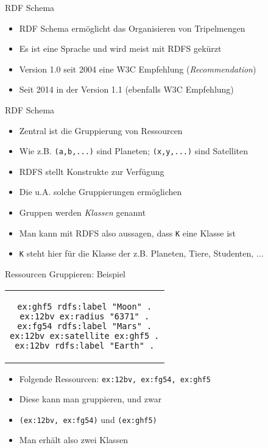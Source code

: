 \documentclass{beamer}
\begin{document}
\begin{frame}{RDF Schema}
	
	\begin{itemize}
		\item RDF Schema ermöglicht das Organisieren von Tripelmengen
		\item Es ist eine Sprache und wird meist mit RDFS gekürzt
		\item Version 1.0 seit 2004 eine W3C Empfehlung (\emph{Recommendation})
		\item Seit 2014 in der Version 1.1 (ebenfalls W3C Empfehlung)
	\end{itemize}
	
\end{frame}

\begin{frame}{RDF Schema}
	
	\begin{itemize}
		\item Zentral ist die Gruppierung von Ressourcen
		\item Wie z.B. \texttt{(a,b,...)} sind Planeten; \texttt{(x,y,...)} sind Satelliten
		\item RDFS stellt Konstrukte zur Verfügung 
		\item Die u.A. solche Gruppierungen ermöglichen
		\item Gruppen werden \emph{Klassen} genannt
		\item Man kann mit RDFS also aussagen, dass \texttt{K} eine Klasse ist
		\item \texttt{K} steht hier für die Klasse der z.B. Planeten, Tiere, Studenten, ...
	\end{itemize}
	
\end{frame}

\begin{frame}[fragile]{Ressourcen Gruppieren: Beispiel}
	
    \begin{center}
    	\begin{tabular}{c}
			\begin{lstlisting}
ex:ghf5 rdfs:label "Moon" .
ex:12bv ex:radius "6371" .
ex:fg54 rdfs:label "Mars" .
ex:12bv ex:satellite ex:ghf5 .
ex:12bv rdfs:label "Earth" .
			\end{lstlisting}
		\end{tabular}
	\end{center}
	
	\begin{itemize}
		\item Folgende Ressourcen: \texttt{ex:12bv, ex:fg54, ex:ghf5} 
		\item Diese kann man gruppieren, und zwar
		\item \texttt{(ex:12bv, ex:fg54)} und \texttt{(ex:ghf5)}
		\item Man erhält also zwei Klassen
	\end{itemize}
	
\end{frame}
\end{document}
